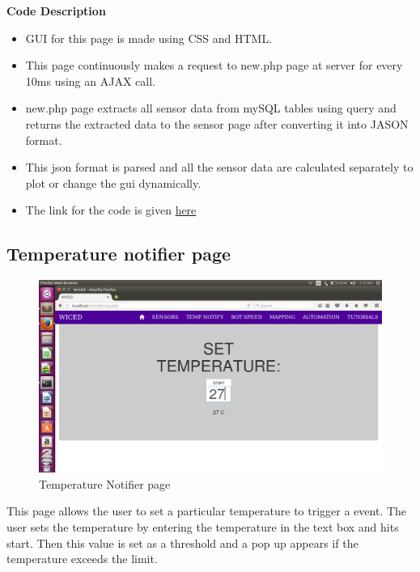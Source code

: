 \documentclass[a4paper,12pt,oneside]{book}
\begin{document}
        \textbf{Code Description}
        
        \begin{itemize}
        \item GUI for this page is made using CSS and HTML.
        \item This page continuously makes a request to new.php page at server for every 10ms using an AJAX call.
        \item new.php page extracts all sensor data from mySQL tables using query and returns the extracted data to the sensor page after converting it into JASON format.
        \item This json format is parsed and all the sensor data are calculated separately to plot or change the gui dynamically.
        
        \item The link for the code is given \href{https://github.com/eYSIP-2016/Wiced-Sense/blob/master/Codes/wiced%20web/javascript/sensors.js}{here}
        \end{itemize}




\newpage
\subsection{Temperature notifier page}



\begin{figure}[h]
        \centering
    	\includegraphics[scale=0.2]{temp12.png}
    	\caption{Temperature Notifier page}
	    \end{figure}
	    
	    
 This page allows the user to set a particular temperature to trigger a event. The user sets the temperature by entering the temperature in the text box and hits start. Then this value is set as a threshold and a pop up appears if the temperature exceeds the limit.\\
\end{document}
